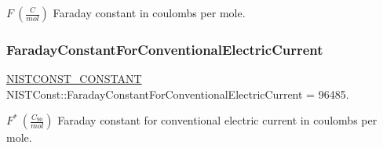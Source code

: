 $F \ (\frac{C}{mol})$ Faraday constant in coulombs per mole. \mbox{\label{group___n_i_s_t_const-_faraday_constant_gabb6fe7c894f8b742e96391914b960f5b}} 
\subsubsection{\texorpdfstring{Faraday\+Constant\+For\+Conventional\+Electric\+Current}{FaradayConstantForConventionalElectricCurrent}}
{\footnotesize\ttfamily \mbox{\hyperlink{group___n_i_s_t_const-_macros_ga2b0fc1d7452373f816175dd86ce26729}{N\+I\+S\+T\+C\+O\+N\+S\+T\+\_\+\+C\+O\+N\+S\+T\+A\+NT}} N\+I\+S\+T\+Const\+::\+Faraday\+Constant\+For\+Conventional\+Electric\+Current = 96485.}

$F^\ast \ (\frac{C_{90}}{mol})$ Faraday constant for conventional electric current in coulombs per mole. 